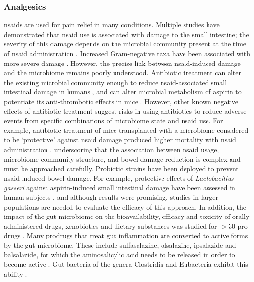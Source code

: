 \subsubsection{Analgesics}
\Glspl{nsaid} are used for pain relief in many conditions. Multiple studies have demonstrated that \gls{nsaid} use is associated with damage to the small intestine; the severity of this damage depends on the microbial community present at the time of \gls{nsaid} administration \cite{RN35, RN4109}. Increased Gram-negative taxa have been associated with more severe damage \cite{RN4109, RN4124}. However, the precise link between \gls{nsaid}-induced damage and the microbiome remains poorly understood. Antibiotic treatment can alter the existing microbial community enough to reduce \gls{nsaid}-associated small intestinal damage in humans \cite{RN4085}, and can alter microbial metabolism of aspirin to potentiate its anti-thrombotic effects in mice \cite{RN4090}. However, other known negative effects of antibiotic treatment suggest risks in using antibiotics to reduce adverse events from specific combinations of microbiome state and \gls{nsaid} use. For example, antibiotic treatment of mice transplanted with a microbiome considered to be `protective' against \gls{nsaid} damage produced higher mortality with \gls{nsaid} administration \cite{RN4089}, underscoring that the association between \gls{nsaid} usage, microbiome community structure, and bowel damage reduction is complex and must be approached carefully. Probiotic strains have been deployed to prevent \gls{nsaid}-induced bowel damage. For example, protective effects of \textit{Lactobacillus gasseri} against aspirin-induced small intestinal damage have been assessed in human subjects \cite{RN4091}, and although results were promising, studies in larger populations are needed to evaluate the efficacy of this approach. In addition, the impact of the gut microbiome on the bioavailability, efficacy and toxicity of orally administered drugs, xenobiotics and dietary substances was studied for $>$30 pro-drugs \cite{RN4136}. Many prodrugs that treat gut inflammation are converted to active forms by the gut microbiome. These include sulfasalazine, olsalazine, ipsalazide and balsalazide, for which the aminosalicylic acid needs to be released in order to become active \cite{RN4093}. Gut bacteria of the genera Clostridia and Eubacteria exhibit this ability \cite{RN4094}.

